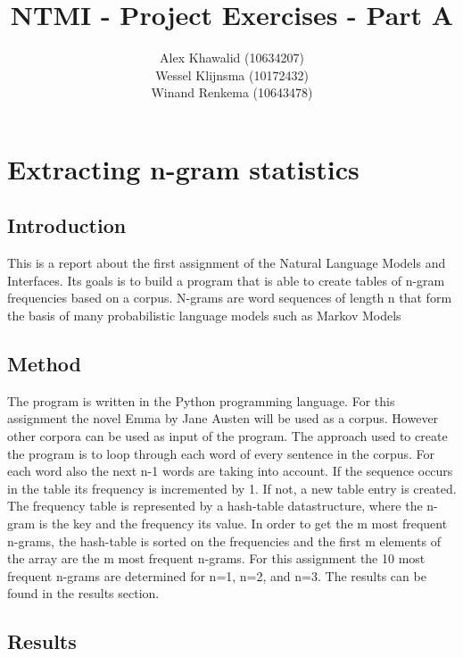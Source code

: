 \documentclass[a4paper, 10pt]{article}
\title{NTMI - Project Exercises - Part A}
\author{Alex Khawalid (10634207)\\
Wessel Klijnsma (10172432)\\
Winand Renkema (10643478)\\
}
\begin{document}
\maketitle

\section{Extracting n-gram statistics}

\subsection{Introduction}
This is a report about the first assignment of the Natural Language Models and Interfaces. Its goals is to build a program that is able to create tables of n-gram frequencies based on a corpus. N-grams are word sequences of length n that form the basis of many probabilistic language models such as Markov Models

\subsection{Method}
The program is written in the Python programming language. For this assignment the novel Emma by Jane Austen will be used as a corpus. However other corpora can be used as input of the program.
The approach used to create the program is to loop through each word of every sentence in the corpus. For each word also the next n-1 words are taking into account. If the sequence occurs in the table its frequency is incremented by 1. If not, a new table entry is created.
The frequency table is represented by a hash-table datastructure, where the n-gram is the key and the frequency its value.
In order to get the m most frequent n-grams, the hash-table is sorted on the frequencies and the first m elements of the array are the m most frequent n-grams. For this assignment the 10 most frequent n-grams are determined for n=1, n=2, and n=3. The results can be found in the results section.

\subsection{Results}
\end{document}

